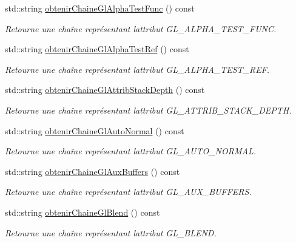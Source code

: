 \begin{DoxyCompactItemize}
std\+::string \hyperlink{group__utilitaire_ga5002fd87fb9aede24afc4c4bb2a61fb1}{obtenir\+Chaine\+Gl\+Alpha\+Test\+Func} () const 
\begin{DoxyCompactList}\small\item\em Retourne une chaîne représentant l\textquotesingle{}attribut G\+L\+\_\+\+A\+L\+P\+H\+A\+\_\+\+T\+E\+S\+T\+\_\+\+F\+U\+N\+C. \end{DoxyCompactList}\item 
std\+::string \hyperlink{group__utilitaire_gacc2904dcf7edec91f24e5e6ea58a780c}{obtenir\+Chaine\+Gl\+Alpha\+Test\+Ref} () const 
\begin{DoxyCompactList}\small\item\em Retourne une chaîne représentant l\textquotesingle{}attribut G\+L\+\_\+\+A\+L\+P\+H\+A\+\_\+\+T\+E\+S\+T\+\_\+\+R\+E\+F. \end{DoxyCompactList}\item 
std\+::string \hyperlink{group__utilitaire_ga59c1e206aa477f625b5499cf328f695b}{obtenir\+Chaine\+Gl\+Attrib\+Stack\+Depth} () const 
\begin{DoxyCompactList}\small\item\em Retourne une chaîne représentant l\textquotesingle{}attribut G\+L\+\_\+\+A\+T\+T\+R\+I\+B\+\_\+\+S\+T\+A\+C\+K\+\_\+\+D\+E\+P\+T\+H. \end{DoxyCompactList}\item 
std\+::string \hyperlink{group__utilitaire_gaaf8d3f8a4dd51812950c32268c8f77c5}{obtenir\+Chaine\+Gl\+Auto\+Normal} () const 
\begin{DoxyCompactList}\small\item\em Retourne une chaîne représentant l\textquotesingle{}attribut G\+L\+\_\+\+A\+U\+T\+O\+\_\+\+N\+O\+R\+M\+A\+L. \end{DoxyCompactList}\item 
std\+::string \hyperlink{group__utilitaire_gab8c780e176faece6cbaa11084e957e8d}{obtenir\+Chaine\+Gl\+Aux\+Buffers} () const 
\begin{DoxyCompactList}\small\item\em Retourne une chaîne représentant l\textquotesingle{}attribut G\+L\+\_\+\+A\+U\+X\+\_\+\+B\+U\+F\+F\+E\+R\+S. \end{DoxyCompactList}\item 
std\+::string \hyperlink{group__utilitaire_ga8a5f949f2b7a9a911c0677d639bebae5}{obtenir\+Chaine\+Gl\+Blend} () const 
\begin{DoxyCompactList}\small\item\em Retourne une chaîne représentant l\textquotesingle{}attribut G\+L\+\_\+\+B\+L\+E\+N\+D. \end{DoxyCompactList}\item 

\end{DoxyCompactItemize}
